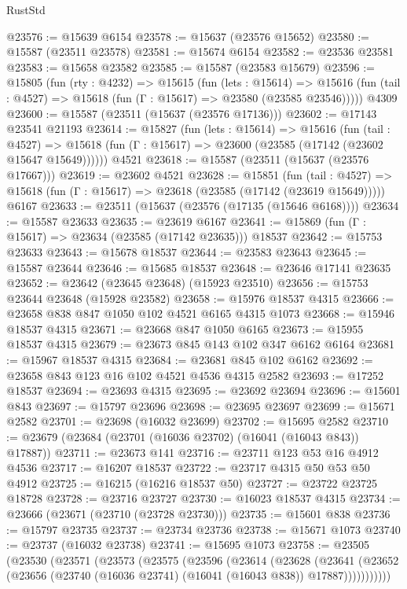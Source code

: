 \begin{lexlean}{RustStd}
\begin{coremodule}
@23576 := @15639 @6154
@23578 := @15637 (@23576 @15652)
@23580 := @15587 (@23511 @23578)
@23581 := @15674 @6154
@23582 := @23536 @23581
@23583 := @15658 @23582
@23585 := @15587 (@23583 @15679)
@23596 := @15805
    (fun (rty : @4232) =>
    @15615
      (fun (lets : @15614) =>
      @15616 (fun (tail : @4527) => @15618 (fun (Γ : @15617) => @23580 (@23585 @23546)))))
    @4309
@23600 := @15587 (@23511 (@15637 (@23576 @17136)))
@23602 := @17143 @23541 @21193
@23614 := @15827
    (fun (lets : @15614) =>
    @15616
      (fun (tail : @4527) =>
      @15618 (fun (Γ : @15617) => @23600 (@23585 (@17142 (@23602 @15647 @15649))))))
    @4521
@23618 := @15587 (@23511 (@15637 (@23576 @17667)))
@23619 := @23602 @4521
@23628 := @15851
    (fun (tail : @4527) => @15618 (fun (Γ : @15617) => @23618 (@23585 (@17142 (@23619 @15649)))))
    @6167
@23633 := @23511 (@15637 (@23576 (@17135 (@15646 @6168))))
@23634 := @15587 @23633
@23635 := @23619 @6167
@23641 := @15869 (fun (Γ : @15617) => @23634 (@23585 (@17142 @23635))) @18537
@23642 := @15753 @23633
@23643 := @15678 @18537
@23644 := @23583 @23643
@23645 := @15587 @23644
@23646 := @15685 @18537
@23648 := @23646 @17141 @23635
@23652 := @23642 (@23645 @23648) (@15923 @23510)
@23656 := @15753 @23644 @23648 (@15928 @23582)
@23658 := @15976 @18537 @4315
@23666 := @23658 @838 @847 @1050 @102 @4521 @6165 @4315 @1073
@23668 := @15946 @18537 @4315
@23671 := @23668 @847 @1050 @6165
@23673 := @15955 @18537 @4315
@23679 := @23673 @845 @143 @102 @347 @6162 @6164
@23681 := @15967 @18537 @4315
@23684 := @23681 @845 @102 @6162
@23692 := @23658 @843 @123 @16 @102 @4521 @4536 @4315 @2582
@23693 := @17252 @18537
@23694 := @23693 @4315
@23695 := @23692 @23694
@23696 := @15601 @843
@23697 := @15797 @23696
@23698 := @23695 @23697
@23699 := @15671 @2582
@23701 := @23698 (@16032 @23699)
@23702 := @15695 @2582
@23710 := @23679 (@23684 (@23701 (@16036 @23702) (@16041 (@16043 @843)) @17887))
@23711 := @23673 @141
@23716 := @23711 @123 @53 @16 @4912 @4536
@23717 := @16207 @18537
@23722 := @23717 @4315 @50 @53 @50 @4912
@23725 := @16215 (@16216 @18537 @50)
@23727 := @23722 @23725 @18728
@23728 := @23716 @23727
@23730 := @16023 @18537 @4315
@23734 := @23666 (@23671 (@23710 (@23728 @23730)))
@23735 := @15601 @838
@23736 := @15797 @23735
@23737 := @23734 @23736
@23738 := @15671 @1073
@23740 := @23737 (@16032 @23738)
@23741 := @15695 @1073
@23758 := @23505
    (@23530
      (@23571
        (@23573
          (@23575
            (@23596
              (@23614
                (@23628
                  (@23641
                    (@23652 (@23656 (@23740 (@16036 @23741) (@16041 (@16043 @838)) @17887)))))))))))

\end{coremodule}
\end{lexlean}
